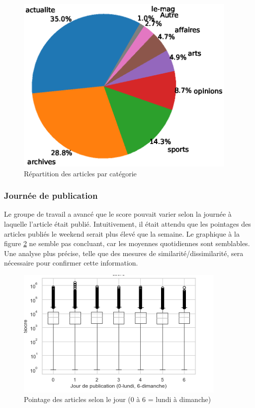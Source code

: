 \documentclass[french]{article}
\begin{document}
\begin{figure}[H]
\centering
\includegraphics[width=0.95\textwidth]{graph_pie_category_repartition.eps}
\caption{Répartition des articles par catégorie}
\label{fig:graph_category_repartition}
\end{figure}

\subsubsection{Journée de publication}
Le groupe de travail a avancé que le score pouvait varier selon la journée à laquelle l'article était publié. Intuitivement, il était attendu que les pointages des articles publiés le weekend serait plus élevé que la semaine. Le graphique à la figure \ref{fig:graph_dayofweek} ne semble pas concluant, car les moyennes quotidiennes sont semblables. Une analyse plus précise, telle que des mesures de similarité/dissimilarité, sera nécessaire pour confirmer cette information.

\begin{figure}[h!]
\centering
\includegraphics[width=0.9\textwidth]{gr020.png}
\caption{Pointage des articles selon le jour (0 à 6 = lundi à dimanche)}
\label{fig:graph_dayofweek}
\end{figure}
\end{document}
